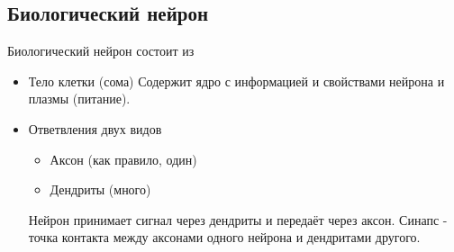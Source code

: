 	    \subsection{Биологический нейрон}
		    Биологический нейрон состоит из
    		\begin{itemize}
    		    \item Тело клетки (сома)
    				Содержит ядро с информацией и свойствами нейрона и плазмы (питание). 
    			\item Ответвления двух видов
    			    \begin{itemize}
    			        \item Аксон (как правило, один)
    				    \item Дендриты (много)
    			    \end{itemize}
    			    Нейрон принимает сигнал через дендриты и передаёт через аксон. 
    			    Синапс - точка контакта между аксонами одного нейрона и дендритами другого.
    		\end{itemize}
		
